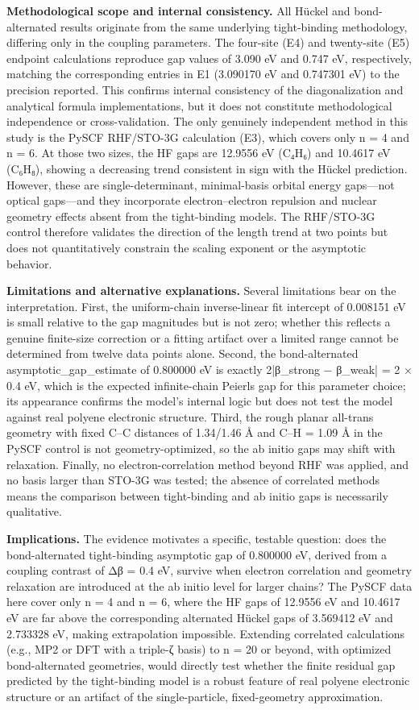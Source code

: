 \documentclass[11pt,a4paper]{article}
\begin{document}
\textbf{Methodological scope and internal consistency.} All Hückel and bond-alternated results originate from the same underlying tight-binding methodology, differing only in the coupling parameters. The four-site (E4) and twenty-site (E5) endpoint calculations reproduce gap values of 3.090 eV and 0.747 eV, respectively, matching the corresponding entries in E1 (3.090170 eV and 0.747301 eV) to the precision reported. This confirms internal consistency of the diagonalization and analytical formula implementations, but it does not constitute methodological independence or cross-validation. The only genuinely independent method in this study is the PySCF RHF/STO-3G calculation (E3), which covers only n = 4 and n = 6. At those two sizes, the HF gaps are 12.9556 eV (C₄H₆) and 10.4617 eV (C₆H₈), showing a decreasing trend consistent in sign with the Hückel prediction. However, these are single-determinant, minimal-basis orbital energy gaps—not optical gaps—and they incorporate electron–electron repulsion and nuclear geometry effects absent from the tight-binding models. The RHF/STO-3G control therefore validates the direction of the length trend at two points but does not quantitatively constrain the scaling exponent or the asymptotic behavior.

\textbf{Limitations and alternative explanations.} Several limitations bear on the interpretation. First, the uniform-chain inverse-linear fit intercept of 0.008151 eV is small relative to the gap magnitudes but is not zero; whether this reflects a genuine finite-size correction or a fitting artifact over a limited range cannot be determined from twelve data points alone. Second, the bond-alternated asymptotic\_gap\_estimate of 0.800000 eV is exactly 2|β\_strong − β\_weak| = 2 × 0.4 eV, which is the expected infinite-chain Peierls gap for this parameter choice; its appearance confirms the model's internal logic but does not test the model against real polyene electronic structure. Third, the rough planar all-trans geometry with fixed C–C distances of 1.34/1.46 Å and C–H = 1.09 Å in the PySCF control is not geometry-optimized, so the ab initio gaps may shift with relaxation. Finally, no electron-correlation method beyond RHF was applied, and no basis larger than STO-3G was tested; the absence of correlated methods means the comparison between tight-binding and ab initio gaps is necessarily qualitative.

\textbf{Implications.} The evidence motivates a specific, testable question: does the bond-alternated tight-binding asymptotic gap of 0.800000 eV, derived from a coupling contrast of Δβ = 0.4 eV, survive when electron correlation and geometry relaxation are introduced at the ab initio level for larger chains? The PySCF data here cover only n = 4 and n = 6, where the HF gaps of 12.9556 eV and 10.4617 eV are far above the corresponding alternated Hückel gaps of 3.569412 eV and 2.733328 eV, making extrapolation impossible. Extending correlated calculations (e.g., MP2 or DFT with a triple-ζ basis) to n = 20 or beyond, with optimized bond-alternated geometries, would directly test whether the finite residual gap predicted by the tight-binding model is a robust feature of real polyene electronic structure or an artifact of the single-particle, fixed-geometry approximation.
\end{document}
